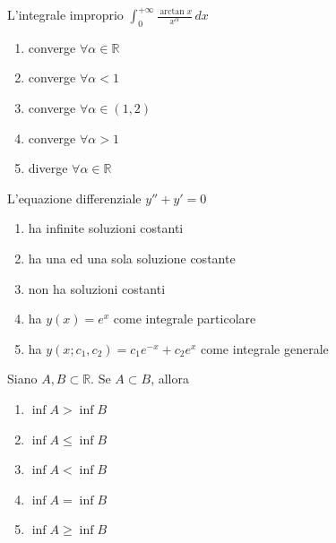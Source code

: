 \begin{quiz}
L'integrale improprio $\displaystyle\int_0^{+\infty}\frac{\arctan x}{x^\alpha}\,dx$
\begin{enumerate}
\item converge $\forall\alpha\in\mathbb R$
\item converge $\forall\alpha<1$
\item converge $\forall\alpha\in(1,2)$
\item converge $\forall\alpha>1$
\item diverge $\forall\alpha\in\mathbb R$
\end{enumerate}
\end{quiz}

\begin{quiz}
L'equazione differenziale $y''+y'=0$
\begin{enumerate}
\item ha infinite soluzioni costanti
\item ha una ed una sola soluzione costante
\item non ha soluzioni costanti
\item ha $y(x)=e^x$ come integrale particolare
\item ha $y(x;c_1,c_2)=c_1e^{-x}+c_2e^x$ come integrale generale
\end{enumerate}
\end{quiz}

\begin{quiz}
Siano $A,B\subset\mathbb R$. Se $A\subset B$, allora
\begin{enumerate}
\item $\inf A>\inf B$
\item $\inf A\le\inf B$
\item $\inf A<\inf B$
\item $\inf A=\inf B$
\item $\inf A\ge\inf B$
\end{enumerate}
\end{quiz}

